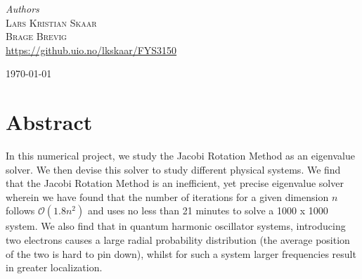 \begin{titlepage}
		{\large\textit{Authors}}\\
		\textsc{Lars Kristian Skaar}\\\textsc{Brage Brevig} %
		\\
		\url{https://github.uio.no/lkskaar/FYS3150}
		
		\vfill\vfill\vfill %
		
		{\large\today} %
		
		
		\vfill\vfill
		
		
		
	\end{titlepage}

	\newpage
	\setlength\parindent{0pt}
	\section{Abstract}
	In this numerical project, we study the Jacobi Rotation Method as an eigenvalue solver. We then devise this solver to study different physical systems. We find that the Jacobi Rotation Method is an inefficient, yet precise eigenvalue solver wherein we have found that the number of iterations for a given dimension $n$ follows $\mathcal{O}(1.8n^2)$ and uses no less than 21 minutes to solve a 1000 x 1000 system. We also find that in quantum harmonic oscillator systems, introducing two electrons causes a large radial probability distribution (the average position of the two is hard to pin down), whilst for such a system larger frequencies result in greater localization. 
	\tableofcontents
	\newpage
